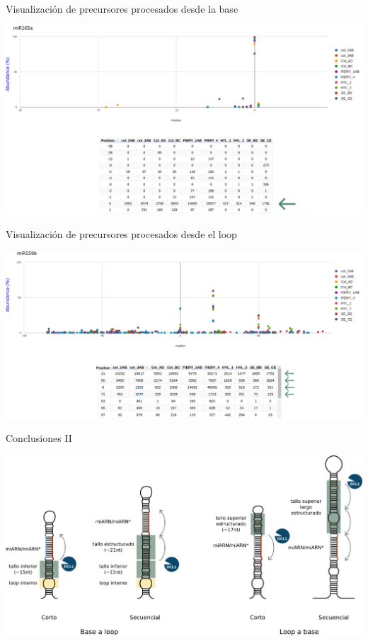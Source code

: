 \documentclass{beamer}
\begin{document}
\begin{frame}{Visualización de precursores procesados desde la base}
	\begin{center}
		\includegraphics[width=1\textwidth]{img/miR165a_SPARE.png}
	\end{center}
\end{frame}

\begin{frame}{Visualización de precursores procesados desde el loop}
	\begin{center}
		\includegraphics[width=1\textwidth]{img/miR159b_SPARE.png}
	\end{center}
\end{frame}


\begin{frame}{Conclusiones II}
	\begin{center}
		\includegraphics[width=1\textwidth]{img/mecanismos.png}
	\end{center}
\end{frame}
\end{document}
